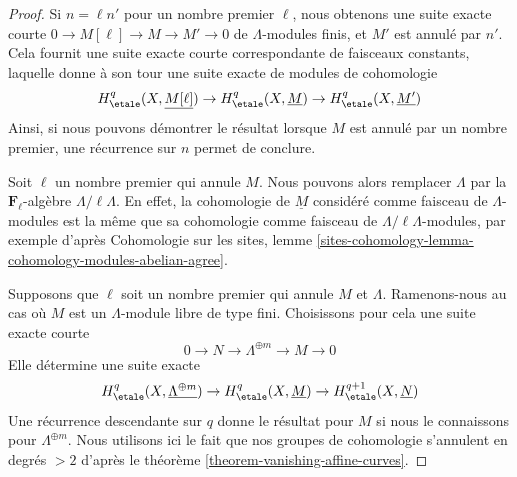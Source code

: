 \begin{proof}
Si $n = \ell n'$ pour un nombre premier $\ell$, nous obtenons une suite
exacte courte $0 \to M[\ell] \to M \to M' \to 0$ de $\Lambda$-modules
finis, et $M'$ est annulé par $n'$.
Cela fournit une suite exacte courte correspondante de faisceaux constants,
laquelle donne à son tour une suite
exacte de modules de cohomologie
$$
H^q_\etale(X, \underline{M[\ell]}) \to
H^q_\etale(X, \underline{M}) \to
H^q_\etale(X, \underline{M'})
$$
Ainsi, si nous pouvons démontrer le résultat lorsque $M$ est annulé par
un nombre premier, une récurrence sur $n$ permet de conclure.

\medskip\noindent
Soit $\ell$ un nombre premier qui annule $M$.
Nous pouvons alors remplacer $\Lambda$ par la $\mathbf{F}_\ell$-algèbre
$\Lambda/\ell \Lambda$. En effet,
la cohomologie de $\underline{M}$ considéré comme faisceau de
$\Lambda$-modules est la même que sa cohomologie comme faisceau de
$\Lambda/\ell \Lambda$-modules, par exemple d'après
Cohomologie sur les sites, lemme
\ref{sites-cohomology-lemma-cohomology-modules-abelian-agree}.

\medskip\noindent
Supposons que $\ell$ soit un nombre premier qui annule $M$
et $\Lambda$.
Ramenons-nous au cas où $M$ est un $\Lambda$-module libre de type fini.
Choisissons pour cela une suite exacte courte
$$
0 \to N \to \Lambda^{\oplus m} \to M \to 0
$$
Elle détermine une suite exacte
$$
H^q_\etale(X, \underline{\Lambda^{\oplus m}}) \to
H^q_\etale(X, \underline{M}) \to
H^{q + 1}_\etale(X, \underline{N})
$$
Une récurrence descendante sur $q$ donne le résultat pour $M$
si nous le connaissons pour $\Lambda^{\oplus m}$.
Nous utilisons ici le fait que nos groupes de cohomologie
s'annulent en degrés $> 2$
d'après le théorème \ref{theorem-vanishing-affine-curves}.


\end{proof}
